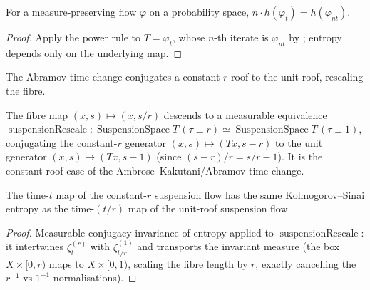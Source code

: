 \begin{theorem}\label{thm:susp-nsmulKs}
  \leanok
  For a measure-preserving flow $\varphi$ on a probability space,
  $n \cdot h(\varphi_t) = h(\varphi_{nt})$.
\end{theorem}
\begin{proof}\leanok
  Apply the power rule  to $T = \varphi_t$, whose $n$-th iterate is
  $\varphi_{nt}$ by ; entropy depends only on the underlying map.
\end{proof}

The Abramov time-change conjugates a constant-$r$ roof to the unit roof, rescaling the fibre.

\begin{definition}\label{thm:susp-rescale}
  \leanok
  The fibre map $(x, s) \mapsto (x, s/r)$ descends to a measurable equivalence
  $\operatorname{suspensionRescale} : \operatorname{SuspensionSpace} T\,(\tau \equiv r) \simeq
  \operatorname{SuspensionSpace} T\,(\tau \equiv 1)$, conjugating the constant-$r$ generator
  $(x, s) \mapsto (Tx, s - r)$ to the unit generator $(x, s) \mapsto (Tx, s - 1)$ (since
  $(s - r)/r = s/r - 1$). It is the constant-roof case of the Ambrose--Kakutani/Abramov time-change.
\end{definition}

\begin{theorem}\label{thm:susp-rescaleKs}
  \leanok
  The time-$t$ map of the constant-$r$ suspension flow has the same Kolmogorov--Sinai entropy as the
  time-$(t/r)$ map of the unit-roof suspension flow.
\end{theorem}
\begin{proof}\leanok
  Measurable-conjugacy invariance of entropy applied to $\operatorname{suspensionRescale}$: it
  intertwines $\zeta^{(r)}_t$ with $\zeta^{(1)}_{t/r}$ and transports the invariant measure (the box
  $X \times [0, r)$ maps to $X \times [0, 1)$, scaling the fibre length by $r$, exactly cancelling
  the $r^{-1}$ vs $1^{-1}$ normalisations).
\end{proof}

